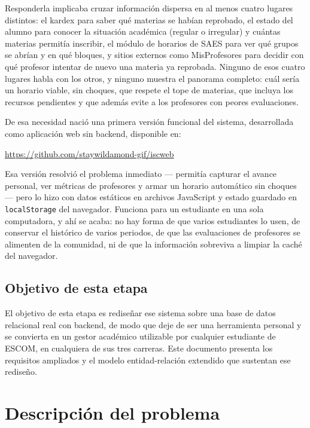 \documentclass[11pt,letterpaper]{article}
\begin{document}
Responderla implicaba cruzar información dispersa en al menos cuatro lugares distintos: el kardex para saber qué materias se habían reprobado, el estado del alumno para conocer la situación académica (regular o irregular) y cuántas materias permitía inscribir, el módulo de horarios de SAES para ver qué grupos se abrían y en qué bloques, y sitios externos como MisProfesores para decidir con qué profesor intentar de nuevo una materia ya reprobada. Ninguno de esos cuatro lugares habla con los otros, y ninguno muestra el panorama completo: cuál sería un horario viable, sin choques, que respete el tope de materias, que incluya los recursos pendientes y que además evite a los profesores con peores evaluaciones.

De esa necesidad nació una primera versión funcional del sistema, desarrollada como aplicación web sin backend, disponible en:

\begin{center}
\url{https://github.com/staywildamond-gif/iscweb}
\end{center}

Esa versión resolvió el problema inmediato --- permitía capturar el avance personal, ver métricas de profesores y armar un horario automático sin choques --- pero lo hizo con datos estáticos en archivos JavaScript y estado guardado en \texttt{localStorage} del navegador. Funciona para un estudiante en una sola computadora, y ahí se acaba: no hay forma de que varios estudiantes lo usen, de conservar el histórico de varios periodos, de que las evaluaciones de profesores se alimenten de la comunidad, ni de que la información sobreviva a limpiar la caché del navegador.

\subsection{Objetivo de esta etapa}

El objetivo de esta etapa es rediseñar ese sistema sobre una base de datos relacional real con backend, de modo que deje de ser una herramienta personal y se convierta en un gestor académico utilizable por cualquier estudiante de ESCOM, en cualquiera de sus tres carreras. Este documento presenta los requisitos ampliados y el modelo entidad-relación extendido que sustentan ese rediseño.

\section{Descripción del problema}
\end{document}
